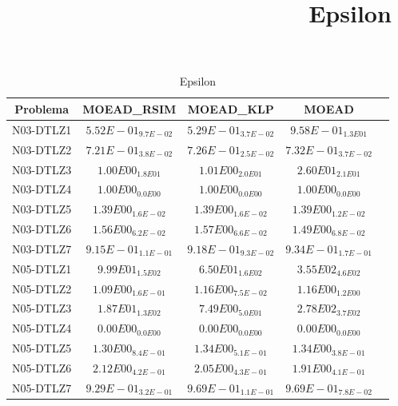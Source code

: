 \documentclass{article}
\title{Epsilon}
\author{}
\begin{document}
\maketitle
\begin{table*}[ht!]
\scriptsize
\caption{Epsilon}
\centering\begin{tabular}{|c||c||c||c||c|} \hline
Problema &MOEAD_RSIM &MOEAD_KLP &MOEAD\\\hline
N03-DTLZ1 &\cellcolor{gray25}$5.52E-01_{9.7E-02}$ &\cellcolor{gray95}$5.29E-01_{3.7E-02}$ &$9.58E-01_{1.3E01}$\\ 
\hline
N03-DTLZ2 &\cellcolor{gray95}$7.21E-01_{3.8E-02}$ &\cellcolor{gray25}$7.26E-01_{2.5E-02}$ &$7.32E-01_{3.7E-02}$\\ 
\hline
N03-DTLZ3 &\cellcolor{gray95}$1.00E00_{1.8E01}$ &\cellcolor{gray25}$1.01E00_{2.0E01}$ &$2.60E01_{2.1E01}$\\ 
\hline
N03-DTLZ4 &\cellcolor{gray95}$1.00E00_{0.0E00}$ &\cellcolor{gray25}$1.00E00_{0.0E00}$ &$1.00E00_{0.0E00}$\\ 
\hline
N03-DTLZ5 &$1.39E00_{1.6E-02}$ &\cellcolor{gray95}$1.39E00_{1.6E-02}$ &\cellcolor{gray25}$1.39E00_{1.2E-02}$\\ 
\hline
N03-DTLZ6 &\cellcolor{gray25}$1.56E00_{6.2E-02}$ &$1.57E00_{6.6E-02}$ &\cellcolor{gray95}$1.49E00_{6.8E-02}$\\ 
\hline
N03-DTLZ7 &\cellcolor{gray95}$9.15E-01_{1.1E-01}$ &\cellcolor{gray25}$9.18E-01_{9.3E-02}$ &$9.34E-01_{1.7E-01}$\\ 
\hline
N05-DTLZ1 &\cellcolor{gray25}$9.99E01_{1.5E02}$ &\cellcolor{gray95}$6.50E01_{1.6E02}$ &$3.55E02_{4.6E02}$\\ 
\hline
N05-DTLZ2 &\cellcolor{gray95}$1.09E00_{1.6E-01}$ &\cellcolor{gray25}$1.16E00_{7.5E-02}$ &$1.16E00_{1.2E00}$\\ 
\hline
N05-DTLZ3 &\cellcolor{gray25}$1.87E01_{1.3E02}$ &\cellcolor{gray95}$7.49E00_{5.0E01}$ &$2.78E02_{3.7E02}$\\ 
\hline
N05-DTLZ4 &\cellcolor{gray95}$0.00E00_{0.0E00}$ &\cellcolor{gray25}$0.00E00_{0.0E00}$ &$0.00E00_{0.0E00}$\\ 
\hline
N05-DTLZ5 &\cellcolor{gray95}$1.30E00_{8.4E-01}$ &$1.34E00_{5.1E-01}$ &\cellcolor{gray25}$1.34E00_{3.8E-01}$\\ 
\hline
N05-DTLZ6 &$2.12E00_{4.2E-01}$ &\cellcolor{gray25}$2.05E00_{4.3E-01}$ &\cellcolor{gray95}$1.91E00_{4.1E-01}$\\ 
\hline
N05-DTLZ7 &\cellcolor{gray95}$9.29E-01_{3.2E-01}$ &$9.69E-01_{1.1E-01}$ &\cellcolor{gray25}$9.69E-01_{7.8E-02}$\\ 

\end{tabular}
\end{table*}
\end{document}
